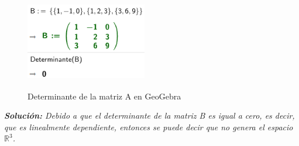 \begin{figure}[ht!]
    \centering
    \includegraphics[width=150pt,height=120pt]{img/imagen17.png}
    \caption{Determinante de la matriz A en GeoGebra}
\end{figure}

\begin{center}
    \textit{\textbf{Solución: }Debido a que el determinante de la matriz B es igual a cero, es decir, que es linealmente dependiente, entonces se puede decir que no genera el espacio $\mathbb{R}^3$.}
\end{center}
